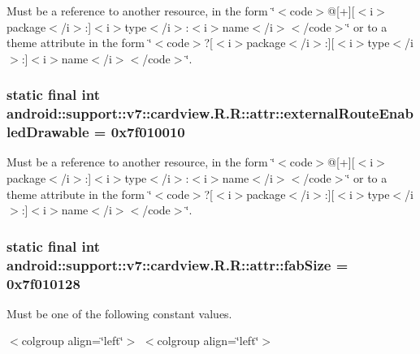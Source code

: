Must be a reference to another resource, in the form \char`\"{}$<$code$>$@\mbox{[}+\mbox{]}\mbox{[}$<$i$>$package$<$/i$>$:\mbox{]}$<$i$>$type$<$/i$>$:$<$i$>$name$<$/i$>$$<$/code$>$\char`\"{} or to a theme attribute in the form \char`\"{}$<$code$>$?\mbox{[}$<$i$>$package$<$/i$>$:\mbox{]}\mbox{[}$<$i$>$type$<$/i$>$:\mbox{]}$<$i$>$name$<$/i$>$$<$/code$>$\char`\"{}. \hypertarget{classandroid_1_1support_1_1v7_1_1cardview_1_1_r_1_1attr_a246be6778c7eead7e20e0fd194ab2a5}{
\subsubsection[{externalRouteEnabledDrawable}]{\setlength{\rightskip}{0pt plus 5cm}static final int android::support::v7::cardview.R.R::attr::externalRouteEnabledDrawable = 0x7f010010}}
\label{classandroid_1_1support_1_1v7_1_1cardview_1_1_r_1_1attr_a246be6778c7eead7e20e0fd194ab2a5}


Must be a reference to another resource, in the form \char`\"{}$<$code$>$@\mbox{[}+\mbox{]}\mbox{[}$<$i$>$package$<$/i$>$:\mbox{]}$<$i$>$type$<$/i$>$:$<$i$>$name$<$/i$>$$<$/code$>$\char`\"{} or to a theme attribute in the form \char`\"{}$<$code$>$?\mbox{[}$<$i$>$package$<$/i$>$:\mbox{]}\mbox{[}$<$i$>$type$<$/i$>$:\mbox{]}$<$i$>$name$<$/i$>$$<$/code$>$\char`\"{}. \hypertarget{classandroid_1_1support_1_1v7_1_1cardview_1_1_r_1_1attr_233b4e6346f109f1ba71344f8b825098}{
\subsubsection[{fabSize}]{\setlength{\rightskip}{0pt plus 5cm}static final int android::support::v7::cardview.R.R::attr::fabSize = 0x7f010128}}
\label{classandroid_1_1support_1_1v7_1_1cardview_1_1_r_1_1attr_233b4e6346f109f1ba71344f8b825098}


Must be one of the following constant values. \begin{TabularC}{0}
\hline
\end{TabularC}
$<$colgroup align=\char`\"{}left\char`\"{}$>$ $<$colgroup align=\char`\"{}left\char`\"{}$>$ 

